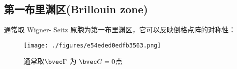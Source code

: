 \subsection{第一布里渊区(Brillouin zone)}
通常取 Wigner- Seitz 原胞为第一布里渊区，它可以反映倒格点阵的对称性：
\begin{figure}[ht]
\centering
\texttt{[image: ./figures/e54eded0edfb3563.png]}
\caption{通常取$\bvec \Gamma$ 为 $\bvec G = 0$点} \label{fig_BriZon_1}
\end{figure}
